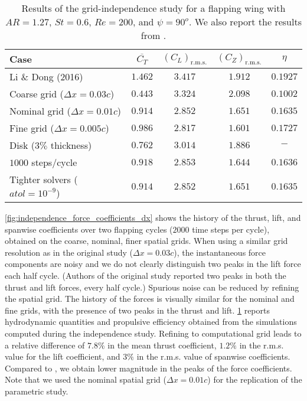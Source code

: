 \begin{table}
  \centering
  \begin{tabular}{lcccc}
    \hline\hline
    Case & $\overline{C_T}$ & $\left( C_L \right)_\text{r.m.s.}$ & $\left( C_Z \right)_\text{r.m.s.}$ & $\eta$ \\
    \hline
    Li \& Dong (2016) & $1.462$ & $3.417$ & $1.912$ & $0.1927$ \\
    Coarse grid ($\Delta x = 0.03c$) & $0.443$ & $3.324$ & $2.098$ & $0.1002$ \\
    Nominal grid ($\Delta x = 0.01c$) & $0.914$ & $2.852$ & $1.651$ & $0.1635$ \\
    Fine grid ($\Delta x = 0.005c$) & $0.986$ & $2.817$ & $1.601$ & $0.1727$ \\
    Disk ($3\%$ thickness) & $0.762$ & $3.014$ & $1.886$ & $-$ \\
    $1000$ steps/cycle & $0.918$ & $2.853$ & $1.644$ & $0.1636$ \\
    Tighter solvers ($atol = 10^{-9}$) & $0.914$ & $2.852$ & $1.651$ & $0.1635$ \\
    \hline\hline
  \end{tabular}
  \caption{Results of the grid-independence study for a flapping wing with $AR = 1.27$, $St = 0.6$, $Re = 200$, and $\psi = 90^o$. We also report the results from \citet{li_dong_2016}.}
  \label{tab:independence_results}
\end{table}

\cref{fig:independence_force_coefficients_dx} shows the history of the thrust, lift, and spanwise coefficients over two flapping cycles ($2000$ time steps per cycle), obtained on the coarse, nominal, finer spatial grids.
When using a similar grid resolution as in the original study ($\Delta x = 0.03c$), the instantaneous force components are noisy and we do not clearly distinguish two peaks in the lift force each half cycle.
(Authors of the original study reported two peaks in both the thrust and lift forces, every half cycle.)
Spurious noise can be reduced by refining the spatial grid.
The history of the forces is visually similar for the nominal and fine grids, with the presence of two peaks in the thrust and lift.
\cref{tab:independence_results} reports hydrodynamic quantities and propulsive efficiency obtained from the simulations computed during the independence study.
Refining to computational grid leads to a relative difference of $7.8\%$ in the mean thrust coefficient, $1.2\%$ in the r.m.s. value for the lift coefficient, and $3\%$ in the r.m.s. value of spanwise coefficients.
Compared to \citet{li_dong_2016}, we obtain lower magnitude in the peaks of the force coefficients.
Note that we used the nominal spatial grid ($\Delta x = 0.01c$) for the replication of the parametric study.

